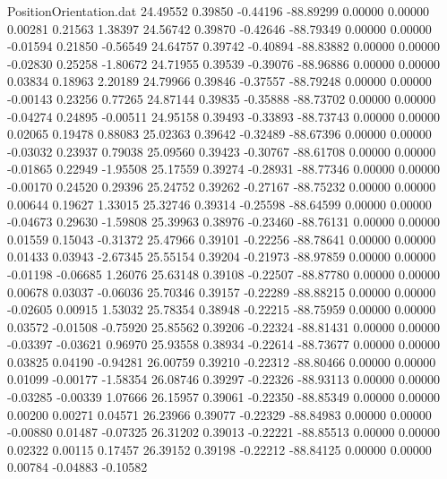\begin{filecontents}{PositionOrientation.dat}
  24.49552    0.39850   -0.44196   -88.89299    0.00000    0.00000    0.00281    0.21563    1.38397
  24.56742    0.39870   -0.42646   -88.79349    0.00000    0.00000   -0.01594    0.21850   -0.56549
  24.64757    0.39742   -0.40894   -88.83882    0.00000    0.00000   -0.02830    0.25258   -1.80672
  24.71955    0.39539   -0.39076   -88.96886    0.00000    0.00000    0.03834    0.18963    2.20189
  24.79966    0.39846   -0.37557   -88.79248    0.00000    0.00000   -0.00143    0.23256    0.77265
  24.87144    0.39835   -0.35888   -88.73702    0.00000    0.00000   -0.04274    0.24895   -0.00511
  24.95158    0.39493   -0.33893   -88.73743    0.00000    0.00000    0.02065    0.19478    0.88083
  25.02363    0.39642   -0.32489   -88.67396    0.00000    0.00000   -0.03032    0.23937    0.79038
  25.09560    0.39423   -0.30767   -88.61708    0.00000    0.00000   -0.01865    0.22949   -1.95508
  25.17559    0.39274   -0.28931   -88.77346    0.00000    0.00000   -0.00170    0.24520    0.29396
  25.24752    0.39262   -0.27167   -88.75232    0.00000    0.00000    0.00644    0.19627    1.33015
  25.32746    0.39314   -0.25598   -88.64599    0.00000    0.00000   -0.04673    0.29630   -1.59808
  25.39963    0.38976   -0.23460   -88.76131    0.00000    0.00000    0.01559    0.15043   -0.31372
  25.47966    0.39101   -0.22256   -88.78641    0.00000    0.00000    0.01433    0.03943   -2.67345
  25.55154    0.39204   -0.21973   -88.97859    0.00000    0.00000   -0.01198   -0.06685    1.26076
  25.63148    0.39108   -0.22507   -88.87780    0.00000    0.00000    0.00678    0.03037   -0.06036
  25.70346    0.39157   -0.22289   -88.88215    0.00000    0.00000   -0.02605    0.00915    1.53032
  25.78354    0.38948   -0.22215   -88.75959    0.00000    0.00000    0.03572   -0.01508   -0.75920
  25.85562    0.39206   -0.22324   -88.81431    0.00000    0.00000   -0.03397   -0.03621    0.96970
  25.93558    0.38934   -0.22614   -88.73677    0.00000    0.00000    0.03825    0.04190   -0.94281
  26.00759    0.39210   -0.22312   -88.80466    0.00000    0.00000    0.01099   -0.00177   -1.58354
  26.08746    0.39297   -0.22326   -88.93113    0.00000    0.00000   -0.03285   -0.00339    1.07666
  26.15957    0.39061   -0.22350   -88.85349    0.00000    0.00000    0.00200    0.00271    0.04571
  26.23966    0.39077   -0.22329   -88.84983    0.00000    0.00000   -0.00880    0.01487   -0.07325
  26.31202    0.39013   -0.22221   -88.85513    0.00000    0.00000    0.02322    0.00115    0.17457
  26.39152    0.39198   -0.22212   -88.84125    0.00000    0.00000    0.00784   -0.04883   -0.10582

\end{filecontents}
